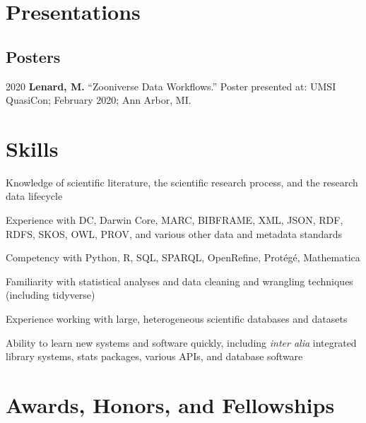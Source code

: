 \documentclass[12pt,letterpaper]{report}
\newcommand{\listitemspace}{0.25em}
\renewenvironment{itemize}
{\begin{list}{}{\setlength{\leftmargin}{0em}
            \setlength{\parskip}{0em}
            \setlength{\itemsep}{\listitemspace}
            \setlength{\parsep}{\listitemspace}}}
{\end{list}}
\begin{document}
\section*{Presentations}
    
\subsection*{Posters}
    
\begin{tablist}
    
	\item[2020] \tab \textbf{Lenard, M.} \enquote{Zooniverse Data Workflows.} Poster presented at: UMSI QuasiCon; February 2020; Ann Arbor, MI.

\end{tablist}



\section*{Skills}

\begin{itemize}

	\item Knowledge of scientific literature, the scientific research process, and the research data lifecycle
        
	\item Experience with DC, Darwin Core, MARC, BIBFRAME, XML, JSON, RDF, RDFS, SKOS, OWL, PROV, and various other data and metadata standards
        
	\item Competency with Python, R, SQL, SPARQL, OpenRefine, Protégé, Mathematica
        
	\item Familiarity with statistical analyses and data cleaning and wrangling techniques (including tidyverse)

	\item Experience working with large, heterogeneous scientific databases and datasets

	\item Ability to learn new systems and software quickly, including \textit{inter alia} integrated library systems, stats packages, various APIs, and database software
        
\end{itemize}



\section*{Awards, Honors, and Fellowships}
\end{document}
